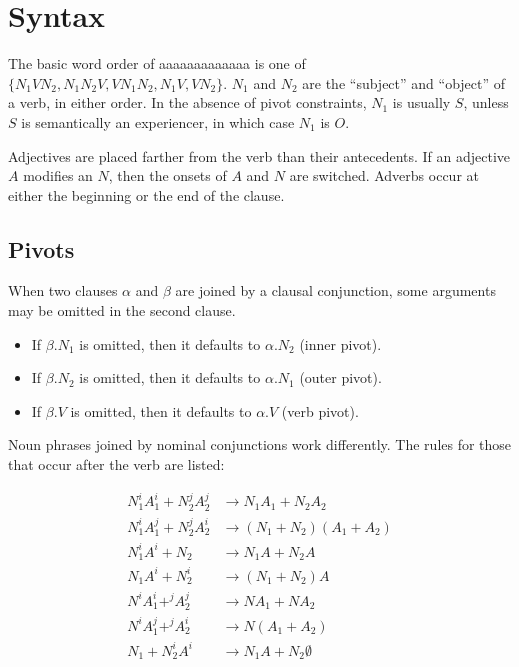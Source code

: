 \documentclass{book}
\newcommand{\lname}{aaaaaaaaaaaaa}
\begin{document}
\chapter{Syntax}

The basic word order of \lname{} is one of $\{N_1VN_2, N_1N_2V, VN_1N_2, N_1V, VN_2\}$. $N_1$ and $N_2$ are the ``subject'' and ``object'' of a verb, in either order. In the absence of pivot constraints, $N_1$ is usually $S$, unless $S$ is semantically an experiencer, in which case $N_1$ is $O$.

Adjectives are placed farther from the verb than their antecedents. If an adjective $A$ modifies an $N$, then the onsets of $A$ and $N$ are switched. Adverbs occur at either the beginning or the end of the clause.

\section{Pivots}

When two clauses $\alpha$ and $\beta$ are joined by a clausal conjunction, some arguments may be omitted in the second clause.

\begin{itemize}
  \item If $\beta.N_1$ is omitted, then it defaults to $\alpha.N_2$ (inner pivot).
  \item If $\beta.N_2$ is omitted, then it defaults to $\alpha.N_1$ (outer pivot).
  \item If $\beta.V$ is omitted, then it defaults to $\alpha.V$ (verb pivot).
\end{itemize}

Noun phrases joined by nominal conjunctions work differently. The rules for those that occur after the verb are listed:

\begin{align}
  N_1^i A_1^i + N_2^j A_2^j &\rightarrow N_1 A_1 + N_2 A_2 \\
  N_1^i A_1^j + N_2^j A_2^i &\rightarrow (N_1 + N_2) (A_1 + A_2) \\
  N_1^i A^i + N_2 &\rightarrow N_1 A + N_2 A \\
  N_1 A^i + N_2^i &\rightarrow (N_1 + N_2) A \\
  N^i A_1^i +^j A_2^j &\rightarrow N A_1 + N A_2 \\
  N^i A_1^j +^j A_2^i &\rightarrow N (A_1 + A_2) \\
  N_1 + N_2^i A^i &\rightarrow N_1 A + N_2 \emptyset
\end{align}
\end{document}
